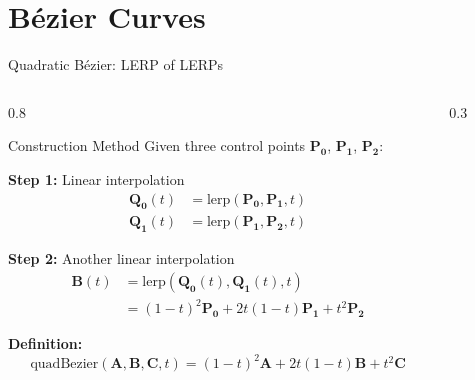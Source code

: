 \section{Bézier Curves}

\begin{frame}{Quadratic Bézier: LERP of LERPs}
  \begin{columns}
    \begin{column}{0.8\textwidth}
      \begin{mathbox}{Construction Method}
        \small
        Given three control points $\mathbf{P_0}$, $\mathbf{P_1}$, $\mathbf{P_2}$:

        \vspace{0.3cm}
        \textbf{Step 1:} Linear interpolation
        \begin{align*}
          \mathbf{Q_0}(t) &= \text{lerp}(\mathbf{P_0}, \mathbf{P_1}, t) \\
          \mathbf{Q_1}(t) &= \text{lerp}(\mathbf{P_1}, \mathbf{P_2}, t)
        \end{align*}

        \textbf{Step 2:} Another linear interpolation
        \begin{align*}
          \mathbf{B}(t) &= \text{lerp}(\mathbf{Q_0}(t), \mathbf{Q_1}(t), t) \\
          &= (1-t)^2\mathbf{P_0} + 2t(1-t)\mathbf{P_1} + t^2\mathbf{P_2}
        \end{align*}

        \textbf{Definition:}
        \[
          \text{quadBezier}(\mathbf{A},\mathbf{B},\mathbf{C},t)
          = (1-t)^2\mathbf{A} + 2t(1-t)\mathbf{B} + t^2\mathbf{C}
        \]
      \end{mathbox}
    \end{column}

    \begin{column}{0.3\textwidth}
      \begin{center}
\end{center}
\end{column}
\end{columns}
\end{frame}
